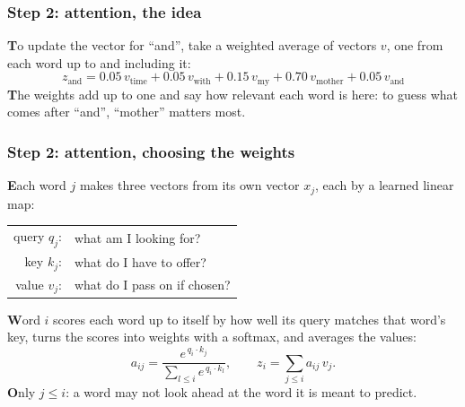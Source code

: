 \documentclass{beamer}
\begin{document}
\begin{frame}
  \frametitle{Step 2: attention, the idea}
\begin{center}
\end{center}
\textbf{T}o update the vector for ``and'', take a weighted average of vectors $v$, one from each word up to and including it:
\[
z_{\text{and}} = 0.05\,v_{\text{time}}+0.05\,v_{\text{with}}+0.15\,v_{\text{my}}+0.70\,v_{\text{mother}}+0.05\,v_{\text{and}}
\]
\textbf{T}he weights add up to one and say how relevant each word is here: to guess what comes after ``and'', ``mother'' matters most.
\end{frame}

\begin{frame}
  \frametitle{Step 2: attention, choosing the weights}
\vskip 0.2cm
\textbf{E}ach word $j$ makes three vectors from its own vector $x_j$, each by a learned linear map:
\vskip 0.1cm
\begin{center}
\begin{tabular}{rl}
query $q_j$: & what am I looking for?\\
key $k_j$: & what do I have to offer?\\
value $v_j$: & what do I pass on if chosen?
\end{tabular}
\end{center}
\vskip 0.1cm
\textbf{W}ord $i$ scores each word up to itself by how well its query matches that word's key, turns the scores into weights with a softmax, and averages the values:
\[
a_{ij}=\frac{e^{\,q_i\cdot k_j}}{\sum_{l\le i}e^{\,q_i\cdot k_l}},\qquad
z_i=\sum_{j\le i}a_{ij}\,v_j .
\]
\textbf{O}nly $j\le i$: a word may not look ahead at the word it is meant to predict.
\end{frame}
\end{document}
